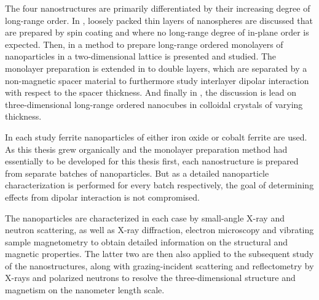 \documentclass[\main/dresen_thesis.tex]{subfiles}
\begin{document}
    The four nanostructures are primarily differentiated by their increasing degree of long-range order.
    In , loosely packed thin layers of nanospheres are discussed that are prepared by spin coating and where no long-range degree of in-plane order is expected.
    Then, in  a method to prepare long-range ordered monolayers of nanoparticles in a two-dimensional lattice is presented and studied.
    The monolayer preparation is extended in  to double layers, which are separated by a non-magnetic spacer material to furthermore study interlayer dipolar interaction with respect to the spacer thickness.
    And finally in , the discussion is lead on three-dimensional long-range ordered nanocubes in colloidal crystals of varying thickness.

    In each study ferrite nanoparticles of either iron oxide or cobalt ferrite are used.
    As this thesis grew organically and the monolayer preparation method had essentially to be developed for this thesis first, each nanostructure is prepared from separate batches of nanoparticles.
    But as a detailed nanoparticle characterization is performed for every batch respectively, the goal of determining effects from dipolar interaction is not compromised.

    The nanoparticles are characterized in each case by small-angle X-ray and neutron scattering, as well as X-ray diffraction, electron microscopy and vibrating sample magnetometry to obtain detailed information on the structural and magnetic properties.
    The latter two are then also applied to the subsequent study of the nanostructures, along with grazing-incident scattering and reflectometry by X-rays and polarized neutrons to resolve the three-dimensional structure and magnetism on the nanometer length scale.
\end{document}
